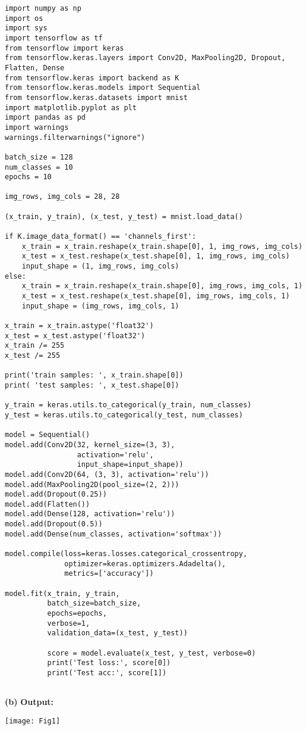 \documentclass[11pt]{article}
\renewcommand\part[1]{\vspace{.10in}\textbf{(#1)}}
\newcommand\ot{\vspace{.10in}\textbf{Output: }}
\begin{document}
\begin{lstlisting}
import numpy as np
import os
import sys
import tensorflow as tf
from tensorflow import keras
from tensorflow.keras.layers import Conv2D, MaxPooling2D, Dropout, Flatten, Dense
from tensorflow.keras import backend as K
from tensorflow.keras.models import Sequential
from tensorflow.keras.datasets import mnist
import matplotlib.pyplot as plt
import pandas as pd
import warnings
warnings.filterwarnings("ignore")

batch_size = 128
num_classes = 10
epochs = 10

img_rows, img_cols = 28, 28

(x_train, y_train), (x_test, y_test) = mnist.load_data()

if K.image_data_format() == 'channels_first':
    x_train = x_train.reshape(x_train.shape[0], 1, img_rows, img_cols)
    x_test = x_test.reshape(x_test.shape[0], 1, img_rows, img_cols)
    input_shape = (1, img_rows, img_cols)
else:
    x_train = x_train.reshape(x_train.shape[0], img_rows, img_cols, 1)
    x_test = x_test.reshape(x_test.shape[0], img_rows, img_cols, 1)
    input_shape = (img_rows, img_cols, 1)

x_train = x_train.astype('float32')
x_test = x_test.astype('float32')
x_train /= 255
x_test /= 255

print('train samples: ', x_train.shape[0])
print( 'test samples: ', x_test.shape[0])

y_train = keras.utils.to_categorical(y_train, num_classes)
y_test = keras.utils.to_categorical(y_test, num_classes)

model = Sequential()
model.add(Conv2D(32, kernel_size=(3, 3),
                 activation='relu',
                 input_shape=input_shape))
model.add(Conv2D(64, (3, 3), activation='relu'))
model.add(MaxPooling2D(pool_size=(2, 2)))
model.add(Dropout(0.25))
model.add(Flatten())
model.add(Dense(128, activation='relu'))
model.add(Dropout(0.5))
model.add(Dense(num_classes, activation='softmax'))

model.compile(loss=keras.losses.categorical_crossentropy,
              optimizer=keras.optimizers.Adadelta(),
              metrics=['accuracy'])

model.fit(x_train, y_train,
          batch_size=batch_size,
          epochs=epochs,
          verbose=1,
          validation_data=(x_test, y_test))

          score = model.evaluate(x_test, y_test, verbose=0)
          print('Test loss:', score[0])
          print('Test acc:', score[1])


\end{lstlisting}

\part{b} \ot

\texttt{[image: Fig1]}
\end{document}
